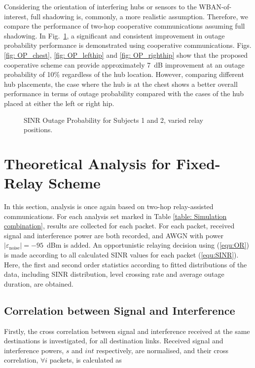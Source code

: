 \documentclass[12pt,draftcls,a4paper,onecolumn,journal]{IEEEtran}
\begin{document}
Considering the orientation of interfering hubs or sensors to the WBAN-of-interest, full shadowing is, commonly, a more realistic assumption. Therefore, we compare the performance of two-hop cooperative communications assuming full shadowing. In Fig.~\ref{fig: outage probability_varyRelay}, a significant and consistent improvement in outage probability performance is demonstrated using cooperative communications. Figs. \ref{fig: OP_chest}, \ref{fig: OP_lefthip} and \ref{fig: OP_righthip} show that the proposed cooperative scheme can provide approximately 7~dB improvement at an outage probability of 10\% regardless of the hub location. However, comparing different hub placements, the case where the hub is at the chest shows a better overall performance in terms of outage probability compared with the cases of the hub placed at either the left or right hip.

\begin{figure}[]
\centering
{}
\caption{SINR Outage Probability for Subjects 1 and 2, varied relay positions.}
\label{fig: outage probability_varyRelay}
\end{figure}

\section{Theoretical Analysis for Fixed-Relay Scheme}
In this section, analysis is once again based on two-hop relay-assisted communications. For each analysis set marked in Table \ref{table: Simulation combination}, results are collected for each packet. For each packet, received signal and interference power are both recorded, and AWGN with power $|\varepsilon_{\mathrm{noise}}| = -95$~dBm is added. An opportunistic relaying decision using (\ref{equ:OR}) is made according to all calculated SINR values for each packet (\ref{equ:SINR}). Here, the first and second order statistics according to fitted distributions of the data, including SINR distribution, level crossing rate and average outage duration, are obtained.

\subsection{Correlation between Signal and Interference}
Firstly, the cross correlation between signal and interference received at the same destinations is investigated, for all destination links. Received signal and interference powers, $s$ and $int$ respectively, are normalised, and their cross correlation, $\forall i$ packets, is calculated as
\end{document}
